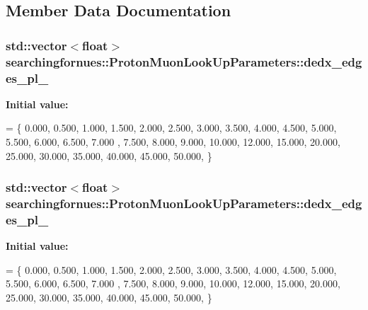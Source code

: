 \subsection{Member Data Documentation}
\subsubsection[{\texorpdfstring{dedx\+\_\+edges\+\_\+pl\+\_\+0}{dedx_edges_pl_0}}]{\setlength{\rightskip}{0pt plus 5cm}std\+::vector$<$float$>$ searchingfornues\+::\+Proton\+Muon\+Look\+Up\+Parameters\+::dedx\+\_\+edges\+\_\+pl\+\_}\hypertarget{structsearchingfornues_1_1ProtonMuonLookUpParameters_a4332caea6401ff8f3be35985763dc694}{}\label{structsearchingfornues_1_1ProtonMuonLookUpParameters_a4332caea6401ff8f3be35985763dc694}
{\bfseries Initial value\+:}
\begin{DoxyCode}
= \{
    0.000, 0.500, 1.000, 1.500, 2.000, 2.500, 3.000, 3.500, 4.000, 4.500, 5.000, 5.500, 6.000, 6.500, 7.000
      , 7.500, 8.000, 9.000, 10.000, 12.000,
    15.000, 20.000, 25.000, 30.000, 35.000, 40.000, 45.000, 50.000,
    \}
\end{DoxyCode}
\subsubsection[{\texorpdfstring{dedx\+\_\+edges\+\_\+pl\+\_\+1}{dedx_edges_pl_1}}]{\setlength{\rightskip}{0pt plus 5cm}std\+::vector$<$float$>$ searchingfornues\+::\+Proton\+Muon\+Look\+Up\+Parameters\+::dedx\+\_\+edges\+\_\+pl\+\_}\hypertarget{structsearchingfornues_1_1ProtonMuonLookUpParameters_ad406565a8f6d6543f42a27a0d0cb4c8f}{}\label{structsearchingfornues_1_1ProtonMuonLookUpParameters_ad406565a8f6d6543f42a27a0d0cb4c8f}
{\bfseries Initial value\+:}
\begin{DoxyCode}
= \{
    0.000, 0.500, 1.000, 1.500, 2.000, 2.500, 3.000, 3.500, 4.000, 4.500, 5.000, 5.500, 6.000, 6.500, 7.000
      , 7.500, 8.000, 9.000, 10.000, 12.000,
    15.000, 20.000, 25.000, 30.000, 35.000, 40.000, 45.000, 50.000,
    \}
\end{DoxyCode}
